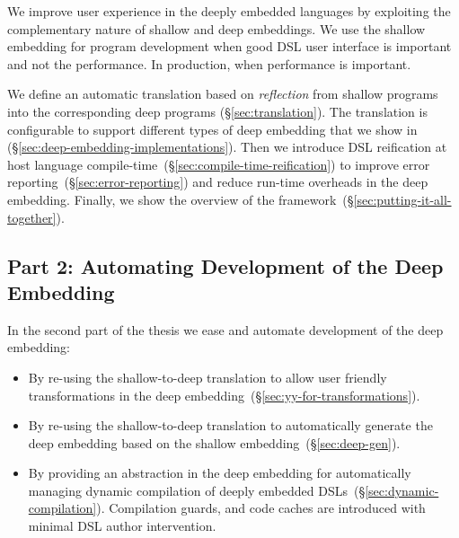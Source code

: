 We improve user experience in the deeply embedded languages by exploiting the complementary
 nature of shallow and deep embeddings. We use the shallow embedding for program development
 when good DSL user interface is important and not the performance. In production,
 when performance is important.

We define an automatic translation based on \emph{reflection} from shallow
 programs into the corresponding deep programs (\S \ref{sec:translation}). The translation
 is configurable to support different types of deep embedding that we show in \yy (\S \ref{sec:deep-embedding-implementations}).
 Then we introduce DSL reification at host language compile-time~(\S \ref{sec:compile-time-reification}) to improve error reporting~(\S \ref{sec:error-reporting}) and reduce run-time overheads in the deep embedding.
 Finally, we show the overview of the framework~(\S \ref{sec:putting-it-all-together}).



\subsection{Part 2: Automating Development of the Deep Embedding}
\label{sec:automating-developemnt}


 In the second part of the thesis we ease and automate development of the deep embedding: \begin{itemize}

   \item By re-using the shallow-to-deep translation to allow user friendly
    transformations in the deep embedding~(\S \ref{sec:yy-for-transformations}).

   \item By re-using the shallow-to-deep translation to automatically generate the
    deep embedding based on the shallow embedding~(\S \ref{sec:deep-gen}).

   \item By providing an abstraction in the deep embedding for automatically managing
     dynamic compilation of deeply embedded DSLs~(\S \ref{sec:dynamic-compilation}). Compilation
     guards, and code caches are introduced with minimal DSL author intervention.

 \end{itemize}

